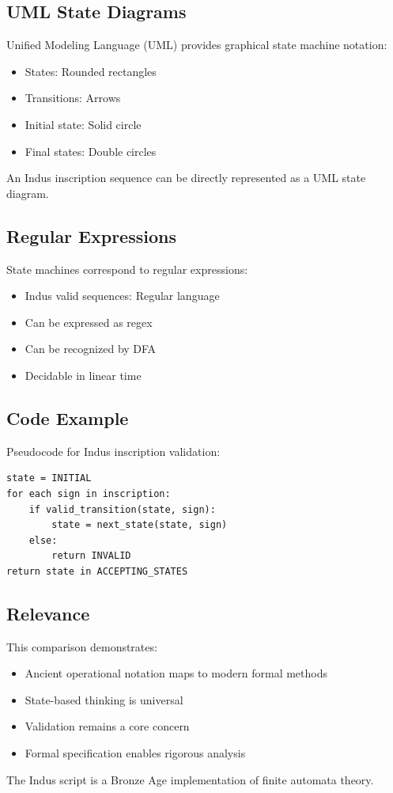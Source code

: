 \subsection{UML State Diagrams}

Unified Modeling Language (UML) provides graphical state machine notation:
\begin{itemize}
    \item States: Rounded rectangles
    \item Transitions: Arrows
    \item Initial state: Solid circle
    \item Final states: Double circles
\end{itemize}

An Indus inscription sequence can be directly represented as a UML state diagram.

\subsection{Regular Expressions}

State machines correspond to regular expressions:
\begin{itemize}
    \item Indus valid sequences: Regular language
    \item Can be expressed as regex
    \item Can be recognized by DFA
    \item Decidable in linear time
\end{itemize}

\subsection{Code Example}

Pseudocode for Indus inscription validation:
\begin{verbatim}
state = INITIAL
for each sign in inscription:
    if valid_transition(state, sign):
        state = next_state(state, sign)
    else:
        return INVALID
return state in ACCEPTING_STATES
\end{verbatim}

\subsection{Relevance}

This comparison demonstrates:
\begin{itemize}
    \item Ancient operational notation maps to modern formal methods
    \item State-based thinking is universal
    \item Validation remains a core concern
    \item Formal specification enables rigorous analysis
\end{itemize}

The Indus script is a Bronze Age implementation of finite automata theory.
